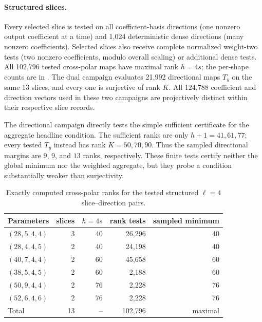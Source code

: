 \documentclass[11pt]{article}
\begin{document}
\paragraph{Structured slices.}
Every selected slice is tested on all coefficient-basis directions (one
nonzero output coefficient at a time) and 1,024 deterministic dense directions
(many nonzero coefficients).  Selected slices also receive complete normalized
weight-two tests (two nonzero coefficients, modulo overall scaling) or
additional dense tests.  All 102,796 tested
cross-polar maps have maximal rank $h=4s$; the per-shape counts are in
.  The dual campaign evaluates 21,992 directional maps
$T_y$ on the same 13 slices, and every one is surjective of rank $K$.
All 124,788 coefficient and direction vectors used in these two campaigns are
projectively distinct within their respective slice records.

The directional campaign directly tests the simple sufficient certificate
for the aggregate headline condition.  The sufficient ranks are only
$h+1=41,61,77$; every tested $T_y$ instead has rank $K=50,70,90$.  Thus the
sampled directional margins are $9$, $9$, and $13$ ranks, respectively.
These finite tests certify neither the global minimum nor the weighted
aggregate, but they probe a condition substantially weaker than surjectivity.

\begin{table}[tbp]
\centering
\caption{Exactly computed cross-polar ranks for the tested structured $\ell=4$ slice--direction pairs.}
\label{tab:cross-polar}
\small
\setlength{\tabcolsep}{5.2pt}
\begin{tabular}{@{}l r r r r@{}}
\toprule
Parameters & slices & $h=4s$ & rank tests & sampled minimum\\
\midrule
$(28,5,4,4)$  & 3 & 40 & 26,296 & 40\\
$(28,4,4,5)$  & 2 & 40 & 24,198 & 40\\
$(40,7,4,4)$  & 2 & 60 & 45,658 & 60\\
$(38,5,4,5)$  & 2 & 60 & 2,188  & 60\\
$(50,9,4,4)$  & 2 & 76 & 2,228  & 76\\
$(52,6,4,6)$  & 2 & 76 & 2,228  & 76\\
\midrule
Total          & 13 & -- & 102,796 & maximal\\
\bottomrule
\end{tabular}
\end{table}
\end{document}
